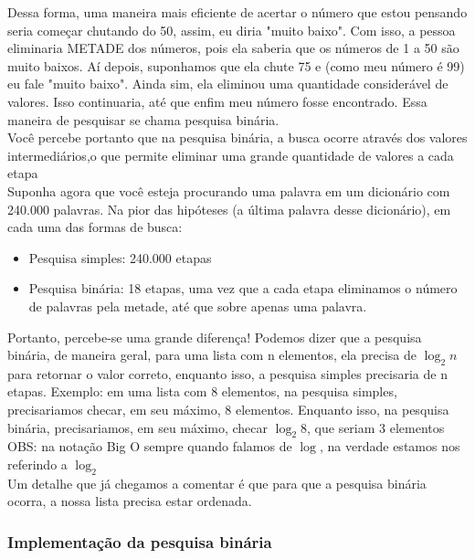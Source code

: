 \documentclass{report}
\begin{document}
	Dessa forma, uma maneira mais eficiente de acertar o número que estou pensando seria começar chutando do 50, assim, eu diria "muito baixo". Com isso, a pessoa eliminaria METADE dos números, pois ela saberia que os números de 1 a 50 são muito baixos. Aí depois, suponhamos que ela chute 75 e (como meu número é 99) eu fale "muito baixo". Ainda sim, ela eliminou uma quantidade considerável de valores. Isso continuaria, até que enfim meu número fosse encontrado. Essa maneira de pesquisar se chama pesquisa binária. \\
	
	Você percebe portanto que na pesquisa binária, a busca ocorre através dos valores intermediários,o que permite eliminar uma grande quantidade de valores a cada etapa \\
	
	Suponha agora que você esteja procurando uma palavra em um dicionário com 240.000 palavras. Na pior das hipóteses (a última palavra desse dicionário), em cada uma das formas de busca:
	
	\begin{itemize}
		\item Pesquisa simples: 240.000 etapas
		\item Pesquisa binária: 18 etapas, uma vez que a cada etapa eliminamos o número de palavras pela metade, até que sobre apenas uma palavra.
	\end{itemize}
	
	Portanto, percebe-se uma grande diferença! Podemos dizer que a pesquisa binária, de maneira geral, para uma lista com n elementos, ela precisa de $\log_{2}n$ para retornar o valor correto, enquanto isso, a pesquisa simples precisaria de n etapas. Exemplo: em uma lista com 8 elementos, na pesquisa simples, precisariamos checar, em seu máximo, 8 elementos. Enquanto isso, na pesquisa binária, precisariamos, em seu máximo, checar $\log_{2}8$, que seriam 3 elementos \\
	
	
	OBS: na notação Big O sempre quando falamos de $\log$, na verdade estamos nos referindo a $\log_{2}$ \\
	
	Um detalhe que já chegamos a comentar é que para que a pesquisa binária ocorra, a nossa lista precisa estar ordenada.
	
	\subsubsection{Implementação da pesquisa binária}
	
\end{document}
